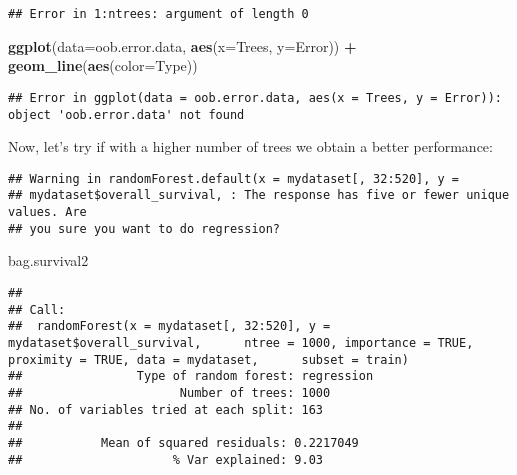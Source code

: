 \documentclass[
]{article}
\newenvironment{Shaded}{\begin{snugshade}}{\end{snugshade}}
\newcommand{\DataTypeTok}[1]{\textcolor[rgb]{0.13,0.29,0.53}{#1}}
\newcommand{\DecValTok}[1]{\textcolor[rgb]{0.00,0.00,0.81}{#1}}
\newcommand{\KeywordTok}[1]{\textcolor[rgb]{0.13,0.29,0.53}{\textbf{#1}}}
\newcommand{\NormalTok}[1]{#1}
\newcommand{\OperatorTok}[1]{\textcolor[rgb]{0.81,0.36,0.00}{\textbf{#1}}}
\newcommand{\OtherTok}[1]{\textcolor[rgb]{0.56,0.35,0.01}{#1}}
\newcommand{\StringTok}[1]{\textcolor[rgb]{0.31,0.60,0.02}{#1}}
\begin{document}
\begin{verbatim}
## Error in 1:ntrees: argument of length 0
\end{verbatim}

\begin{Shaded}
\begin{Highlighting}[]
\KeywordTok{ggplot}\NormalTok{(}\DataTypeTok{data=}\NormalTok{oob.error.data, }\KeywordTok{aes}\NormalTok{(}\DataTypeTok{x=}\NormalTok{Trees, }\DataTypeTok{y=}\NormalTok{Error)) }\OperatorTok{+}
\StringTok{  }\KeywordTok{geom_line}\NormalTok{(}\KeywordTok{aes}\NormalTok{(}\DataTypeTok{color=}\NormalTok{Type))}
\end{Highlighting}
\end{Shaded}

\begin{verbatim}
## Error in ggplot(data = oob.error.data, aes(x = Trees, y = Error)): object 'oob.error.data' not found
\end{verbatim}

Now, let's try if with a higher number of trees we obtain a better
performance:

\begin{Shaded}
\end{Shaded}

\begin{verbatim}
## Warning in randomForest.default(x = mydataset[, 32:520], y =
## mydataset$overall_survival, : The response has five or fewer unique values. Are
## you sure you want to do regression?
\end{verbatim}

\begin{Shaded}
\begin{Highlighting}[]
\NormalTok{bag.survival2}
\end{Highlighting}
\end{Shaded}

\begin{verbatim}
## 
## Call:
##  randomForest(x = mydataset[, 32:520], y = mydataset$overall_survival,      ntree = 1000, importance = TRUE, proximity = TRUE, data = mydataset,      subset = train) 
##                Type of random forest: regression
##                      Number of trees: 1000
## No. of variables tried at each split: 163
## 
##           Mean of squared residuals: 0.2217049
##                     % Var explained: 9.03
\end{verbatim}
\end{document}
